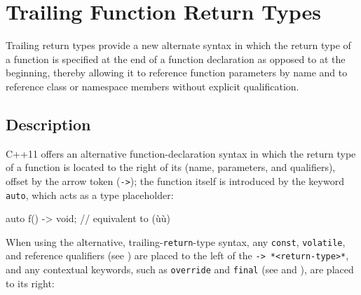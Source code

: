 \newpage
\section[Trailing Return]{Trailing Function Return Types}\label{trailing-function-return-types}

Trailing return types provide a new alternate syntax in which the return type of a function is specified at
the end of a function declaration as opposed to at the beginning,
thereby allowing it to reference function parameters by name and to reference class
or namespace members without explicit qualification.

\subsection[Description]{Description}\label{description}

C++11 offers an alternative function-declaration syntax in which the
return type of a function is located to the right of its
 (name, parameters, and qualifiers), offset by the
arrow token (\lstinline!->!); the function itself is introduced by the
keyword \lstinline!auto!, which acts as a type placeholder:
%

\begin{emcppslisting}
auto f() -> void;  // equivalent to (ù{}ù)
\end{emcppslisting}

When using the alternative, trailing-\lstinline!return!-type syntax, any \lstinline!const!,
\lstinline!volatile!, and reference qualifiers (see
) are placed to the left of
the \lstinline!->!~\lstinline!*<return-type>*!, and any contextual keywords, such as
\lstinline!override! and \lstinline!final! (see
and
), are placed to its right:

